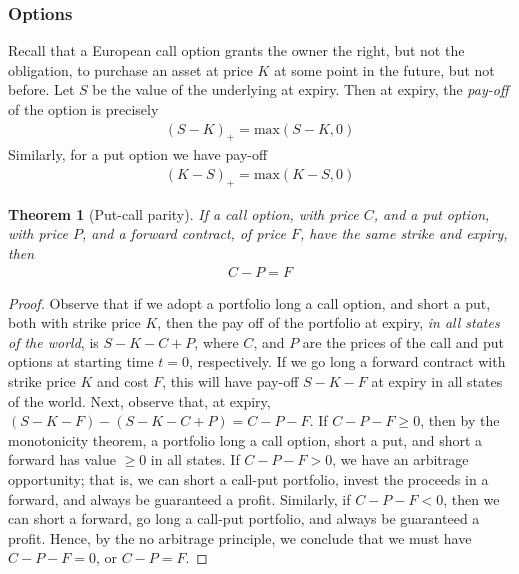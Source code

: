 \documentclass[12pt]{article}
\theoremstyle{plain}
\newtheorem{theorem}{Theorem}
\theoremstyle{definition}
\theoremstyle{remark}
\numberwithin{equation}{section}  %
\begin{document}
\subsubsection{Options}
Recall that a European call option grants the owner the right, but not the 
obligation, to purchase an asset at price $K$ at some point in the future, but 
not before. 
Let $S$ be the value of the underlying at expiry. Then at expiry, the 
\emph{pay-off} of the option is precisely
\begin{equation*}
	\begin{split}
		{(S - K)}_{+} = \text{max}(S - K, 0)
	\end{split}
\end{equation*}
Similarly, for a put option we have pay-off
\begin{equation*}
	\begin{split}
		{(K - S)}_{+} = \text{max}(K - S, 0)
	\end{split}
\end{equation*}
\begin{theorem}[Put-call parity]\label{thm:put-call}
	If a call option, with price $C$, and a put option, with price $P$, and a 
	forward contract, of price $F$, have the same strike and expiry, then
	\begin{equation*}
		\begin{split}
			C - P = F
		\end{split}
	\end{equation*}
\end{theorem}
\begin{proof}
	Observe that if we adopt a portfolio long a call option, and short a put,
	both with strike price $K$, then the pay off of the portfolio at expiry,
	\emph{in all states of the world}, is $S-K -C + P$, where $C$, and $P$ are
	the prices of the call and put options at starting time $t = 0$,
	respectively. If we go long a forward contract with strike price $K$ and
	cost $F$, this will have pay-off $S-K - F$ at expiry in all states of the
	world. 
	Next, observe that, at expiry, $(S - K - F) - (S - K - C + P) = C - P - F$.
	If $C - P - F \ge 0$, then by the monotonicity theorem, a portfolio long a
	call option, short a put, and short a forward has value $\ge 0$ in all
	states. If $C - P - F > 0$, we have an arbitrage opportunity; that is, we 
	can short a call-put portfolio, invest the proceeds in a forward, and 
	always be guaranteed a profit.
	Similarly, if $C - P - F < 0$, then we can short a forward, go long a 
	call-put portfolio, and always be guaranteed a profit. Hence, by the no 
	arbitrage principle, we
	conclude that we must have $C - P - F = 0$, or $C - P = F$. 
\end{proof}
\end{document}
